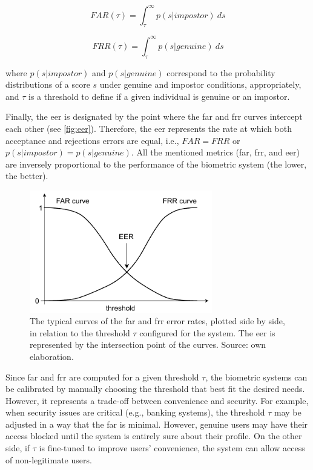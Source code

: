 \begin{equation}
\label{eq:far}
FAR(\tau) = \int_{\tau}^{\infty} p(s|impostor)\ ds
\end{equation}

\begin{equation}
\label{eq:frr}
FRR(\tau) = \int_{\tau}^{\infty} p(s|genuine)\ ds
\end{equation}

\noindent
where $p(s|impostor)$ and $p(s|genuine)$ correspond to the probability distributions of a score $s$ under genuine and impostor conditions, appropriately, and $\tau$ is a threshold to define if a given individual is genuine or an impostor.

Finally, the \acs{eer} is designated by the point where the \acs{far} and \acs{frr} curves intercept each other (see \autoref{fig:eer}). Therefore, the \acs{eer} represents the rate at which both acceptance and rejections errors are equal, i.e., $FAR = FRR$ or $p(s|impostor) = p(s|genuine)$. All the mentioned metrics (\acs{far}, \acs{frr}, and \acs{eer}) are inversely proportional to the performance of the biometric system (the lower, the better).

\begin{figure}[hb]
\centering
\includegraphics[height=2.1in]{images/EER.pdf}
\caption{The typical curves of the \acs{far} and \acs{frr} error rates, plotted side by side, in relation to the threshold $\tau$ configured for the system. The \acs{eer} is represented by the intersection point of the curves. Source: own elaboration.}
\label{fig:eer}
\end{figure}

Since \acs{far} and \acs{frr} are computed for a given threshold $\tau$, the biometric systems can be calibrated by manually choosing the threshold that best fit the desired needs. However, it represents a trade-off between convenience and security. For example, when security issues are critical (e.g., banking systems), the threshold $\tau$ may be adjusted in a way that the \acs{far} is minimal. However, genuine users may have their access blocked until the system is entirely sure about their profile. On the other side, if $\tau$ is fine-tuned to improve users' convenience, the system can allow access of non-legitimate users.

